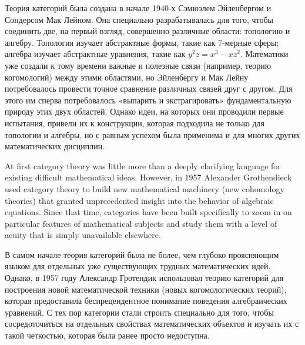 \documentclass[CT4S-EN-RU]{subfiles}
\begin{document}
\begin{blockRUS}
Теория категорий была создана в начале 1940-х Сэмюэлем Эйленбергом и Сондерсом Мак Лейном. Она специально разрабатывалась для того, чтобы соединить две, на первый взгляд, совершенно различные области: топологию и алгебру. Топология изучает абстрактные формы, такие как 7-мерные сферы; алгебра изучает абстрактные уравнения, такие как $y^2z=x^3-xz^2$. Математики уже создали к тому времени важные и полезные связи (например, теорию когомологий) между этими областями, но Эйленбергу и Мак Лейну потребовалось провести точное сравнение различных связей друг с другом. Для этого им сперва потребовалось «выпарить и экстрагировать» фундаментальную природу этих двух областей. Однако идеи, на которых они проводили первые испытания, привели их к конструкции, которая подходила не только для топологии и алгебры, но с равным успехом была применима и для многих других математических дисциплин. 
\end{blockRUS}

\begin{blockENG}
At first category theory was little more than a deeply clarifying language for existing difficult mathematical ideas. However, in 1957 Alexander Grothendieck used category theory to build new mathematical machinery (new cohomology theories) that granted unprecedented insight into the behavior of algebraic equations. Since that time, categories have been built specifically to zoom in on particular features of mathematical subjects and study them with a level of acuity that is simply unavailable elsewhere.
\end{blockENG}

\begin{blockRUS}
В самом начале теория категорий была не более, чем глубоко проясняющим языком для отдельных уже существующих трудных математических идей. Однако, в 1957 году Александр Гротендик использовал теорию категорий для построения новой математической техники (новых когомологических теорий), которая предоставила беспрецендентное понимание поведения алгебраических уравнений. С тех пор категории стали строить специально для того, чтобы сосредоточиться на отдельных свойствах математических объектов и изучать их с такой четкостью, которая была ранее просто недоступна. 
\end{blockRUS}
\end{document}
